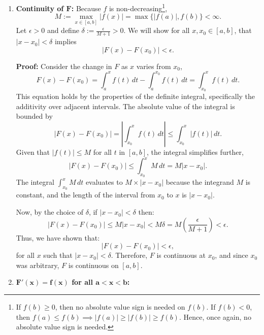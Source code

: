 \begin{enumerate}[label=\textbf{Claim \arabic*:},leftmargin=*]
    \item \textbf{Continuity of $\bm{F}$:} Because \( f \) is non-decreasing\footnote{If $f(b) \ge 0$, then no absolute value sign is needed on $f(b)$. If $f(b) < 0$, then $f(a) \le f(b) \implies |f(a)| \ge |f(b)| \ge f(b)$. Hence, once again, no absolute value sign is needed.}, 
    $$ M := \max_{x \in [a, b]} |f(x)| = \max \{ |f(a)|, f(b) \} < \infty.$$
Let \( \epsilon > 0 \) and define \( \delta := \frac{\epsilon}{M + 1}>0\). We will show for all \( x, x_0 \in [a, b] \), that \( |x - x_0| < \delta \) implies
$$
|F(x) - F(x_0)| < \epsilon.
$$

\textbf{Proof:} Consider the change in \( F \) as \( x \) varies from \( x_0 \),
$$
F(x) - F(x_0) =  \int_{a}^x f(t) \, dt -  \int_{a}^{x_0} f(t) \, dt = \int_{x_0}^x f(t) \, dt.
$$
This equation holds by the properties of the definite integral, specifically the additivity over adjacent intervals. The absolute value of the integral is bounded by
$$
|F(x) - F(x_0)| = \left| \int_{x_0}^x f(t) \, dt \right| \leq \int_{x_0}^x |f(t)| \, dt.
$$
Given that \( |f(t)| \leq M \) for all \( t \) in \([a, b]\), the integral simplifies further,
$$
|F(x) - F(x_0)| \leq \int_{x_0}^x M \, dt = M |x - x_0|.
$$
The integral \( \int_{x_0}^x M \, dt \) evaluates to \( M \times |x - x_0| \) because the integrand \( M \) is constant, and the length of the interval from \( x_0 \) to \( x \) is \( |x - x_0| \).

Now, by the choice of \( \delta \), if \( |x - x_0| < \delta \) then:
$$
|F(x) - F(x_0)| \leq M |x - x_0| < M \delta = M \left(\frac{\epsilon}{M + 1}\right) < \epsilon.
$$
Thus, we have shown that:
$$
|F(x) - F(x_0)| < \epsilon,
$$
for all \( x \) such that \( |x - x_0| < \delta \). Therefore, \( F \) is continuous at \( x_0 \), and since \( x_0 \) was arbitrary, \( F \) is continuous on \([a, b]\).

    \item \textbf{$ \bm{F'(x) = f(x)}$ for all $\bm{a < x < b}$:}\\
    

\end{enumerate}
